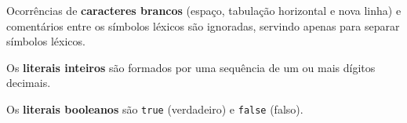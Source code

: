 \documentclass[a4paper,10pt,brazil]{article}
\begin{document}
Ocorrências de \textbf{caracteres brancos} (espaço, tabulação horizontal
e nova linha) e comentários entre os símbolos léxicos são ignoradas,
servindo apenas para separar símbolos léxicos.

Os \textbf{literais inteiros} são formados por uma sequência de um ou
mais dígitos decimais.


Os \textbf{literais booleanos} são \texttt{true} (verdadeiro) e
\texttt{false} (falso).

\end{document}
